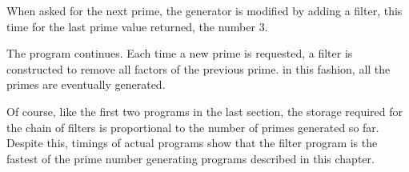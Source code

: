 
When asked for the next prime, the generator is modified by adding a filter,
this time for the last prime value returned, the number 3.


The program continues. Each time a new prime is requested, a filter is
constructed to remove all factors of the previous prime. in this fashion, all
the primes are eventually generated.


Of course, like the first two programs in the last section, the storage required
for the chain of filters is proportional to the number of primes generated so
far. Despite this, timings of actual programs show that the filter program is
the fastest of the prime number generating programs described in this chapter.

